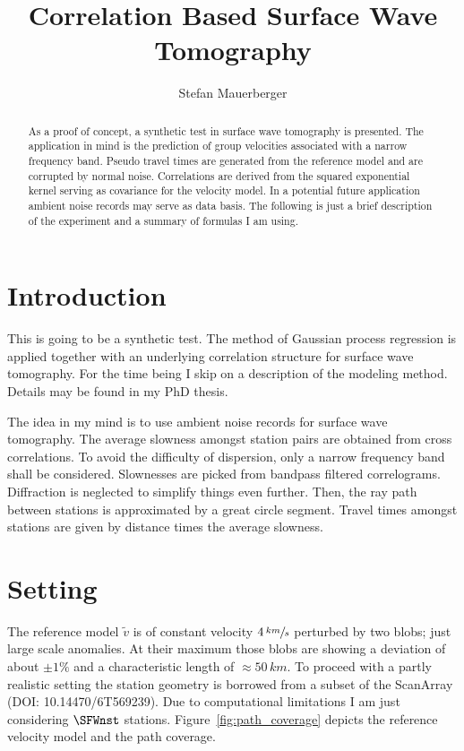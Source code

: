 \documentclass[11pt]{article}
\title{Correlation Based Surface Wave Tomography}
\author{Stefan Mauerberger}
\begin{document}
\maketitle
\begin{abstract}
    As a proof of concept, a synthetic test in surface wave tomography is presented.
    The application in mind is the prediction of group velocities associated with a narrow frequency band.
    Pseudo travel times are generated from the reference model and are corrupted by normal noise.
    Correlations are derived from the squared exponential kernel serving as covariance for the velocity model.
    In a potential future application ambient noise records may serve as data basis.
    The following is just a brief description of the experiment and a summary of formulas I am using.
\end{abstract}

\section{Introduction}


This is going to be a synthetic test.
The method of Gaussian process regression is applied together with an underlying correlation structure for surface wave tomography.
For the time being I skip on a description of the modeling method.
Details may be found in my PhD thesis.

The idea in my mind is to use ambient noise records for surface wave tomography.
The average slowness amongst station pairs are obtained from cross correlations.
To avoid the difficulty of dispersion, only a narrow frequency band shall be considered.
Slownesses are picked from bandpass filtered correlograms.
Diffraction is neglected to simplify things even further.
Then, the ray path between stations is approximated by a great circle segment.
Travel times amongst stations are given by distance times the average slowness.

\section{Setting}

The reference model $\tilde v$ is of constant velocity $4\,\sfrac{km}s$ perturbed by two blobs; just large scale anomalies.
At their maximum those blobs are showing a deviation of about $\pm 1\%$ and a characteristic length of $\approx\!50\,km$.
To proceed with a partly realistic setting the station geometry is borrowed from a subset of the ScanArray (DOI: 10.14470/6T569239).
Due to computational limitations I am just considering $\SFWnst$ stations.
Figure~\ref{fig:path_coverage} depicts the reference velocity model and the path coverage.
\end{document}
